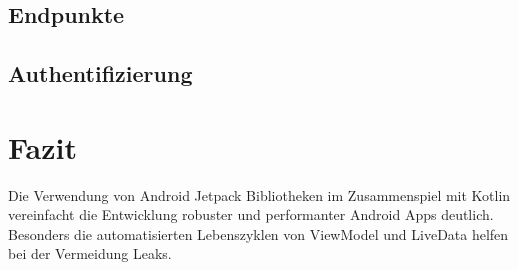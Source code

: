 \documentclass[a4paper, 11pt]{article}
\begin{document}

\subsection{Endpunkte}
\label{subsec:backend:endpoints}


\subsection{Authentifizierung}
\label{subsec:backend:authentication}


\section{Fazit}
\label{sec:conclusion}
Die Verwendung von Android Jetpack Bibliotheken im Zusammenspiel mit Kotlin vereinfacht die Entwicklung robuster und performanter Android Apps deutlich.
Besonders die automatisierten Lebenszyklen von ViewModel und LiveData helfen bei der Vermeidung Leaks.
\end{document}
